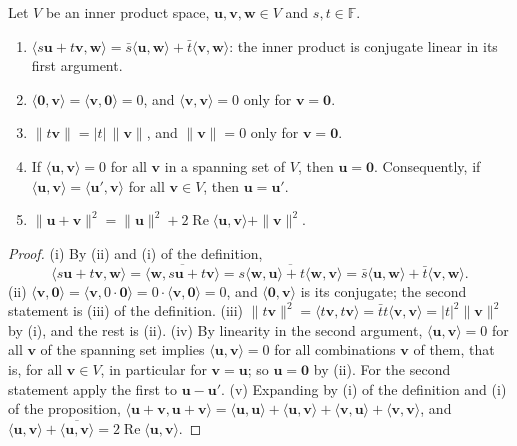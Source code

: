 \begin{proposition}
\label{prop:inner-product-rules}
Let $V$ be an inner product space, $\mathbf u,\mathbf v,\mathbf w\in V$ and $s,t\in\mathbb F$.
\begin{enumerate}
\item $\langle s\mathbf u+t\mathbf v,\mathbf w\rangle=\bar s\langle\mathbf u,\mathbf w\rangle+\bar t\langle\mathbf v,\mathbf w\rangle$: the inner product is conjugate linear in its first argument.
\item $\langle\mathbf 0,\mathbf v\rangle=\langle\mathbf v,\mathbf 0\rangle=0$, and $\langle\mathbf v,\mathbf v\rangle=0$ only for $\mathbf v=\mathbf 0$.
\item $\|t\mathbf v\|=|t|\,\|\mathbf v\|$, and $\|\mathbf v\|=0$ only for $\mathbf v=\mathbf 0$.
\item If $\langle\mathbf u,\mathbf v\rangle=0$ for all $\mathbf v$ in a spanning set of $V$, then $\mathbf u=\mathbf 0$. Consequently, if $\langle\mathbf u,\mathbf v\rangle=\langle\mathbf u',\mathbf v\rangle$ for all $\mathbf v\in V$, then $\mathbf u=\mathbf u'$.
\item $\|\mathbf u+\mathbf v\|^2=\|\mathbf u\|^2+2\operatorname{Re}\langle\mathbf u,\mathbf v\rangle+\|\mathbf v\|^2$.
\end{enumerate}
\end{proposition}

\begin{proof}
(i) By (ii) and (i) of the definition,
\[
\langle s\mathbf u+t\mathbf v,\mathbf w\rangle=\overline{\langle\mathbf w,s\mathbf u+t\mathbf v\rangle}=\overline{s\langle\mathbf w,\mathbf u\rangle+t\langle\mathbf w,\mathbf v\rangle}=\bar s\langle\mathbf u,\mathbf w\rangle+\bar t\langle\mathbf v,\mathbf w\rangle .
\] (ii) $\langle\mathbf v,\mathbf 0\rangle=\langle\mathbf v,0\cdot\mathbf 0\rangle=0\cdot\langle\mathbf v,\mathbf 0\rangle=0$, and $\langle\mathbf 0,\mathbf v\rangle$ is its conjugate; the second statement is (iii) of the definition. (iii) $\|t\mathbf v\|^2=\langle t\mathbf v,t\mathbf v\rangle=\bar tt\langle\mathbf v,\mathbf v\rangle=|t|^2\|\mathbf v\|^2$ by (i), and the rest is (ii). (iv) By linearity in the second argument, $\langle\mathbf u,\mathbf v\rangle=0$ for all $\mathbf v$ of the spanning set implies $\langle\mathbf u,\mathbf v\rangle=0$ for all combinations $\mathbf v$ of them, that is, for all $\mathbf v\in V$, in particular for $\mathbf v=\mathbf u$; so $\mathbf u=\mathbf 0$ by (ii). For the second statement apply the first to $\mathbf u-\mathbf u'$. (v) Expanding by (i) of the definition and (i) of the proposition, $\langle\mathbf u+\mathbf v,\mathbf u+\mathbf v\rangle=\langle\mathbf u,\mathbf u\rangle+\langle\mathbf u,\mathbf v\rangle+\langle\mathbf v,\mathbf u\rangle+\langle\mathbf v,\mathbf v\rangle$, and $\langle\mathbf u,\mathbf v\rangle+\overline{\langle\mathbf u,\mathbf v\rangle}=2\operatorname{Re}\langle\mathbf u,\mathbf v\rangle$.
\end{proof}

